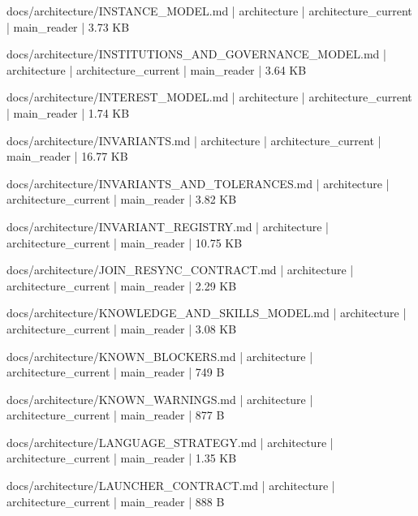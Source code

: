 \documentclass[11pt,a4paper]{report}
\begin{document}
{\small\ttfamily\raggedright docs/\allowbreak{}architecture/\allowbreak{}INSTANCE\_MODEL.\allowbreak{}md | architecture | architecture\_current | main\_reader | 3.\allowbreak{}73 KB\par}
{\small\ttfamily\raggedright docs/\allowbreak{}architecture/\allowbreak{}INSTITUTIONS\_AND\_GOVERNANCE\_MODEL.\allowbreak{}md | architecture | architecture\_current | main\_reader | 3.\allowbreak{}64 KB\par}
{\small\ttfamily\raggedright docs/\allowbreak{}architecture/\allowbreak{}INTEREST\_MODEL.\allowbreak{}md | architecture | architecture\_current | main\_reader | 1.\allowbreak{}74 KB\par}
{\small\ttfamily\raggedright docs/\allowbreak{}architecture/\allowbreak{}INVARIANTS.\allowbreak{}md | architecture | architecture\_current | main\_reader | 16.\allowbreak{}77 KB\par}
{\small\ttfamily\raggedright docs/\allowbreak{}architecture/\allowbreak{}INVARIANTS\_AND\_TOLERANCES.\allowbreak{}md | architecture | architecture\_current | main\_reader | 3.\allowbreak{}82 KB\par}
{\small\ttfamily\raggedright docs/\allowbreak{}architecture/\allowbreak{}INVARIANT\_REGISTRY.\allowbreak{}md | architecture | architecture\_current | main\_reader | 10.\allowbreak{}75 KB\par}
{\small\ttfamily\raggedright docs/\allowbreak{}architecture/\allowbreak{}JOIN\_RESYNC\_CONTRACT.\allowbreak{}md | architecture | architecture\_current | main\_reader | 2.\allowbreak{}29 KB\par}
{\small\ttfamily\raggedright docs/\allowbreak{}architecture/\allowbreak{}KNOWLEDGE\_AND\_SKILLS\_MODEL.\allowbreak{}md | architecture | architecture\_current | main\_reader | 3.\allowbreak{}08 KB\par}
{\small\ttfamily\raggedright docs/\allowbreak{}architecture/\allowbreak{}KNOWN\_BLOCKERS.\allowbreak{}md | architecture | architecture\_current | main\_reader | 749 B\par}
{\small\ttfamily\raggedright docs/\allowbreak{}architecture/\allowbreak{}KNOWN\_WARNINGS.\allowbreak{}md | architecture | architecture\_current | main\_reader | 877 B\par}
{\small\ttfamily\raggedright docs/\allowbreak{}architecture/\allowbreak{}LANGUAGE\_STRATEGY.\allowbreak{}md | architecture | architecture\_current | main\_reader | 1.\allowbreak{}35 KB\par}
{\small\ttfamily\raggedright docs/\allowbreak{}architecture/\allowbreak{}LAUNCHER\_CONTRACT.\allowbreak{}md | architecture | architecture\_current | main\_reader | 888 B\par}
\end{document}
